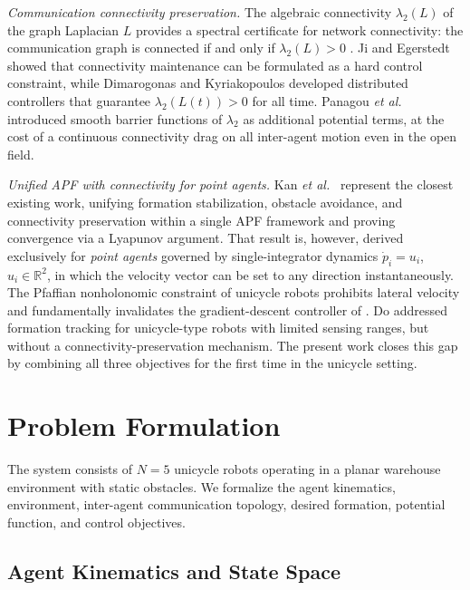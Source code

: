 \documentclass[letterpaper, 10 pt, journal, twoside]{IEEEtran}
\newcommand{\R}{\mathbb{R}}
\begin{document}
\textit{Communication connectivity preservation.}
The algebraic connectivity $\lambda_{2}(L)$ of the graph Laplacian $L$
provides a spectral certificate for network connectivity: the communication
graph is connected if and only if $\lambda_{2}(L)>0$ \cite{ji2007ITR}.
Ji and Egerstedt \cite{ji2007ITR} showed that connectivity maintenance can
be formulated as a hard control constraint, while Dimarogonas and
Kyriakopoulos \cite{dimarogonas2010ICTA} developed distributed controllers
that guarantee $\lambda_{2}(L(t))>0$ for all time.  Panagou
\emph{et al.}\ \cite{panagou2016ITAC} introduced smooth barrier functions
of $\lambda_{2}$ as additional potential terms, at the cost of a continuous
connectivity drag on all inter-agent motion even in the open field.

\textit{Unified APF with connectivity for point agents.}
Kan \emph{et al.}\ \cite{kan2012ITAC} represent the closest existing work,
unifying formation stabilization, obstacle avoidance, and connectivity
preservation within a single APF framework and proving convergence via a
Lyapunov argument.  That result is, however, derived exclusively for
\emph{point agents} governed by single-integrator dynamics
$\dot{p}_{i}=u_{i}$, $u_{i}\in\R^{2}$, in which the velocity vector can
be set to any direction instantaneously.  The Pfaffian nonholonomic
constraint of unicycle robots prohibits lateral velocity and fundamentally
invalidates the gradient-descent controller of \cite{kan2012ITAC}.  Do
\cite{do2008TCST} addressed formation tracking for unicycle-type robots
with limited sensing ranges, but without a connectivity-preservation
mechanism.  The present work closes this gap by combining all three
objectives for the first time in the unicycle setting.


\section{Problem Formulation}

The system consists of $N=5$ unicycle robots operating in a planar warehouse
environment with static obstacles.  We formalize the agent kinematics,
environment, inter-agent communication topology, desired formation, potential
function, and control objectives.

\subsection{Agent Kinematics and State Space}
\end{document}
